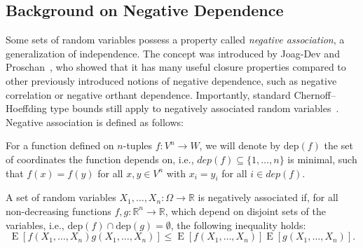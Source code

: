 \documentclass[a4paper,UKenglish,cleveref, autoref, thm-restate]{lipics-v2021}
\DeclareMathOperator{\expect}{\mathrm{E}}
\begin{document}
\subsection{Background on Negative Dependence}
Some sets of random variables possess a property called \emph{negative association}, a generalization of independence.
The concept was introduced by Joag-Dev and Proschan~\cite{joagdev1983}, who showed that it has many useful closure properties compared to other previously introduced notions of negative dependence, such as negative correlation or negative orthant dependence. %
Importantly, standard Chernoff--Hoeffding type bounds still apply to negatively associated random variables~\cite[Prop. 7]{dubhashi1998}.
Negative association is defined as follows:
\begin{definition}
For a function defined on $n$-tuples $f: V^n \rightarrow W$, we will denote by $\mathrm{dep}(f)$ the set of coordinates the function depends on, i.e., $dep(f) \subseteq \{1,\ldots,n\}$ is minimal, such that $f(x) = f(y)$ for all $x, y \in V^n$ with $x_i = y_i$ for all $i \in dep(f)$.
\end{definition}

\begin{definition}\label{def:neg_assoc}
A set of random variables $X_1,\dots,X_n: \Omega \rightarrow \mathbb R$ is negatively associated if, for all non-decreasing functions $f,g: \mathbb R^n \rightarrow \mathbb R$, which depend on disjoint sets of the variables, i.e., $\mathrm{dep}(f) \cap \mathrm{dep}(g) = \emptyset$, the following inequality holds:
\[
\expect [f(X_1,\ldots,X_n) g(X_1,\ldots,X_n)] \leq \expect [f(X_1,\ldots,X_n)] \expect [g(X_1,\ldots,X_n)] \textrm{.}
\]
\end{definition}
\end{document}
